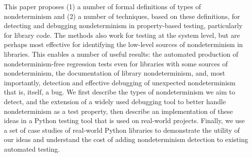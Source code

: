This paper proposes (1) a number of formal definitions of types of
nondeterminism and (2) a number of techniques, based on these definitions, for detecting and debugging
nondeterminism in property-based testing, particularly for library
code.  The methods also work for testing at the system level, but are
perhaps most effective for identifying the low-level sources of
nondeterminism in libraries.  This enables a number of useful results:
 the automated production of
nondeterminism-free regression tests even for libraries with some
sources of nondeterminism, the documentation of library
nondeterminism, and, most importantly, detection and effective debugging of
unexpected nondeterminism that is, itself, a bug.  We first
describe the types of nondeterminism we aim to detect, and the
extension of a widely used debugging tool to better handle
nondeterminism as a test property, then describe an implementation of
these ideas in a Python testing tool that is used on real-world
projects.  Finally, we use a set
of case studies of real-world Python libraries to demonstrate the
utility of our ideas and understand the cost of adding nondeterminism
detection to existing automated testing.